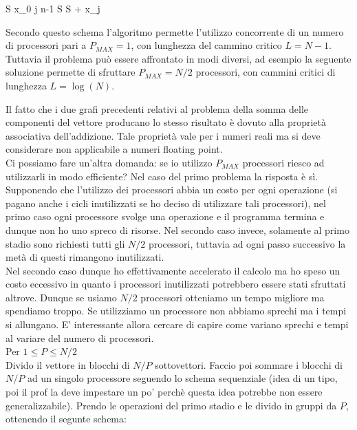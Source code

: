 \documentclass[a4paper,portrait,12pt]{article}
\theoremstyle{definition}
\begin{document}


\begin{program}
S \gets x_0
\FOR j  \TO n-1 \DO
	S \gets S + x_j
\END
\end{program}

Secondo questo schema l’algoritmo permette l’utilizzo concorrente di un numero di processori pari a $P_{MAX} = 1$, con lunghezza del cammino critico $L = N - 1$.\\
Tuttavia il problema può essere affrontato in modi diversi, ad esempio la seguente soluzione permette
di sfruttare $P_{MAX} = N / 2$ processori, con cammini critici di lunghezza $L = \log(N)$.



Il fatto che i due grafi precedenti relativi al problema della somma delle componenti del vettore producano lo stesso risultato è dovuto alla proprietà associativa dell’addizione. Tale proprietà vale per i numeri reali ma si deve considerare non applicabile a numeri floating point.\\

Ci possiamo fare un’altra domanda: se io utilizzo $P_{MAX}$ processori riesco ad utilizzarli in modo efficiente? Nel caso del primo problema la risposta è sì. 
Supponendo che l’utilizzo dei processori abbia un costo per ogni operazione (si pagano anche i cicli inutilizzati se ho deciso di utilizzare tali processori), nel primo caso ogni processore svolge una operazione e il programma termina e dunque non ho uno spreco di risorse. 
Nel secondo caso invece, solamente al primo stadio sono richiesti tutti gli $N/2$ processori, tuttavia ad ogni passo successivo la metà di questi rimangono inutilizzati.\\
Nel secondo caso dunque ho effettivamente accelerato il calcolo ma ho speso un costo eccessivo in quanto i processori inutilizzati potrebbero essere stati sfruttati altrove.
Dunque se usiamo $N/2$ processori otteniamo un tempo migliore ma spendiamo troppo.
Se utilizziamo un processore non abbiamo sprechi ma i tempi si allungano. E’ interessante allora cercare di capire come variano sprechi e tempi al variare del numero di processori.\\

Per $1 \le P \le N/2$\\

Divido il vettore in blocchi di $N/P$ sottovettori. Faccio poi sommare i blocchi di $N/P$ ad un singolo processore seguendo lo schema sequenziale (idea di un tipo, poi il prof la deve impestare un po’ perchè questa idea potrebbe non essere generalizzabile).
Prendo le operazioni del primo stadio e le divido in gruppi da $P$, ottenendo il segunte schema:
\end{document}
